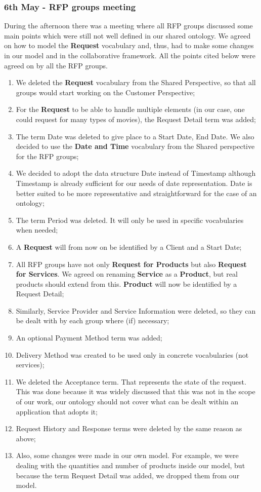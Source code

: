 \documentclass[a4paper,10pt]{article}
\begin{document}
\subsubsection*{6th May - RFP groups meeting}
During the afternoon there was a meeting where all RFP groups discussed some main points which were still not well defined in our shared ontology. We agreed on how to model the \textbf{Request} vocabulary and, thus, had to make some changes in our model and in the collaborative framework. All the points cited below were agreed on by all the RFP groups.
\begin{enumerate}
  \item We deleted the \textbf{Request} vocabulary from the Shared Perspective, so that all groups would start working on the Customer Perspective;
  \item For the \textbf{Request} to be able to handle multiple elements (in our case, one could request for many types of movies), the Request Detail term was added;
  \item The term Date was deleted to give place to a Start Date, End Date. We also decided to use the \textbf{Date and Time} vocabulary from the Shared perspective for the RFP groups;
  \item We decided to adopt the data structure Date instead of Timestamp although Timestamp is already sufficient for our needs of date representation. Date is better suited to be more representative  and straightforward for the case of an ontology;
  \item The term Period was deleted. It will only be used in specific vocabularies when needed;
  \item A \textbf{Request} will from now on be identified by a Client and a Start Date;
  \item All RFP groups have not only \textbf{Request for Products} but also \textbf{Request for Services}. We agreed on renaming \textbf{Service} as a \textbf{Product}, but real products should extend from this. \textbf{Product} will now be identified by a Request Detail;
  \item Similarly, Service Provider and Service Information were deleted, so they can be dealt with by each group where (if) necessary;
  \item An optional Payment Method term was added;
  \item Delivery Method was created to be used only in concrete vocabularies (not services);
  \item We deleted the Acceptance term. That represents the state of the request. This was done because it was widely discussed that this was not in the scope of our work, our ontology should not cover what can be dealt within an application that adopts it;
  \item Request History and Response terms were deleted by the same reason as above;
  \item Also, some changes were made in our own model. For example, we were dealing with the quantities and number of products inside our model, but because the term Request Detail was added, we dropped them from our model.
\end{enumerate}
\end{document}
